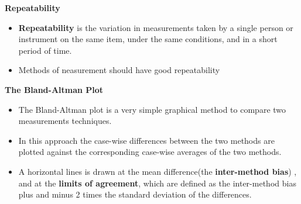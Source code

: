 \documentclass[compress]{beamer}        %
\makeatletter
\newcommand{\tcb}{\textcolor{beamer@blendedblue}}
\makeatother
\begin{document}
\begin{frame}
\Large
\noindent \textbf{Repeatability}
\begin{itemize}
\item \textbf{Repeatability}  is the variation in measurements taken by a single person or instrument on the same item, under the same conditions, and in a short period of time.
\item Methods of neasurement should have good repeatability
\end{itemize}
\end{frame}
		
		\begin{frame}{\bf \tcb{The Bland-Altman Plot}}
			\large
			\begin{itemize}\itemsep0.7cm
				
				\item The Bland-Altman plot \cite{BA86,BA99} is a very simple graphical method to compare two measurements techniques. \item In this approach the case-wise differences between the two methods are plotted against the corresponding case-wise averages of the two methods.
				
				\item A horizontal lines is drawn at the mean difference(the\textbf{ inter-method bias}) , and at the \textbf{limits of agreement}, which are defined as the inter-method bias plus and minus 2 times the standard deviation of the differences.
				
			\end{itemize}
		\end{frame}
		
\end{document}
